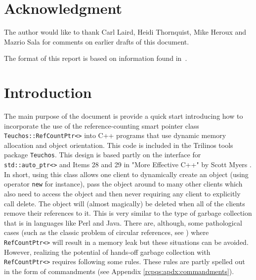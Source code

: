 \documentclass[pdf,ps2pdf,11pt]{SANDreport}
\begin{document}
\section*{Acknowledgment}
The author would like to thank Carl Laird, Heidi Thornquist, Mike
Heroux and Mazrio Sala for comments on earlier drafts of this
document.

The format of this report is based on information found
in~\cite{Sand98-0730}.

%
\clearpage
\tableofcontents

%
\SANDmain %

%
\section{Introduction}
%

The main purpose of the document is provide a quick start introducing
how to incorporate the use of the reference-counting smart pointer
class {}\texttt{Teuchos\-::Ref\-Count\-Ptr<>} into C++ programs that
use dynamic memory allocation and object orientation.  This code is
included in the Trilinos {}\cite{ref:Trilinos-Overview} tools package
{}\texttt{Teuchos}.  This design is based partly on the interface for
{}\texttt{std::auto\_ptr<>} and Items 28 and 29 in "More Effective
C++" by Scott Myers {}\cite{ref:meyers_1996}.  In short, using this
class allows one client to dynamically create an object (using
operator {}\texttt{new} for instance), pass the object around to many
other clients which also need to access the object and then never
requiring any client to explicitly call delete.  The object will
(almost magically) be deleted when all of the clients remove their
references to it.  This is very similar to the type of garbage
collection that is in languages like Perl and Java.  There are,
although, some pathological cases (such as the classic problem of
circular references, see {}\cite[Item 29, page 212]{ref:meyers_1996})
where {}\texttt{Ref\-Count\-Ptr<>} will result in a memory leak but these
situations can be avoided.  However, realizing the potential of
hands-off garbage collection with {}\texttt{Ref\-Count\-Ptr<>} requires
following some rules.  These rules are partly spelled out in the form
of commandments (see Appendix {}\ref{rcpqs:apdx:commandments}).
\end{document}
